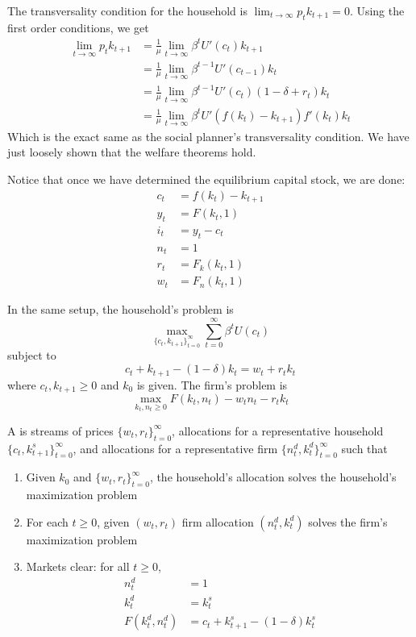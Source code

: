 \documentclass[10pt]{article}
\begin{document}
The transversality condition for the household is $\lim_{t\to\infty} p_t k_{t+1} = 0$. Using the first order conditions, we get
\begin{align*}
	\lim_{t\to\infty} p_t k_{t+1} &= \frac{1}{\mu} \lim_{t\to\infty} \beta^t U'(c_t)k_{t+1} \\
	&= \frac{1}{\mu} \lim_{t\to\infty} \beta^{t-1} U'(c_{t-1})k_{t} \\
	&= \frac{1}{\mu	} \lim_{t\to\infty} \beta^{t-1} U'(c_t) (1 - \delta + r_t) k_t \\
	&= \frac{1}{\mu} \lim_{t\to\infty} \beta^t U'(f(k_t) - k_{t+1}) f'(k_t)k_t
\end{align*}
Which is the exact same as the social planner's transversality condition. We have just loosely shown that the welfare theorems hold.

Notice that once we have determined the equilibrium capital stock, we are done:
\begin{align*}
	c_t &= f(k_t) - k_{t+1} \\
	y_t &= F(k_t,1) \\
	i_t &= y_t - c_t \\
	n_t &= 1 \\
	r_t &= F_k(k_t,1) \\
	w_t &= F_n(k_t,1)
\end{align*}


\begin{model}
	 In the same setup, the household's problem is
	\[
	\max_{\{c_t,k_{t+1}\}_{t=0}^\infty} \sum_{t=0}^\infty \beta^t U(c_t)
	\]
	subject to
	\[
	c_t + k_{t+1} - (1-\delta)k_t = w_t + r_tk_t
	\]
	where $c_t,k_{t+1} \ge 0$ and $k_0$ is given. The firm's problem is
	\[
	\max_{k_t,n_t \ge 0} F(k_t,n_t) - w_tn_t - r_tk_t
	\]
\end{model}

\begin{definition}
	A  is streams of prices $\{w_t,r_t\}_{t=0}^\infty$, allocations for a representative household $\{c_t,k_{t+1}^s\}_{t=0}^\infty$, and allocations for a representative firm $\{n_t^d,k_t^d\}_{t=0}^\infty$ such that
	\begin{enumerate}
		\item Given $k_0$ and $\{w_t,r_t\}_{t=0}^\infty$, the household's allocation solves the household's maximization problem
		\item For each $t \ge 0$, given $(w_t,r_t)$ firm allocation $(n_t^d,k_t^d)$ solves the firm's maximization problem
		\item Markets clear: for all $t \ge 0$,
		\begin{align*}
			n_t^d &= 1 \\
			k_t^d &= k_t^s \\
			F(k_t^d , n_t^d) &= c_t + k_{t+1}^s - (1-\delta)k_t^s
		\end{align*}
	\end{enumerate}
\end{definition}
\end{document}
